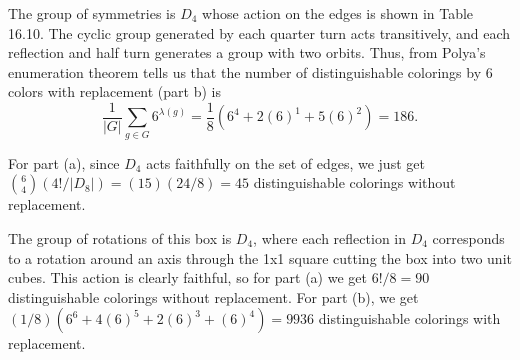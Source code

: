 \documentclass{article}
\begin{document}
 The group of symmetries is $D_4$ whose action on the edges is shown in Table 16.10.  The cyclic group generated by each quarter turn acts transitively, and each reflection and half turn generates a group with two orbits.
Thus, from Polya's enumeration theorem tells us that the number of distinguishable colorings by 6 colors with replacement (part b) is
$$ \frac 1 {|G|} \sum_{g \in G} 6^{\lambda(g)}
= \frac 1 8 (6^4 + 2(6)^1 + 5(6)^2) 
= 186.
$$

For part (a), since $D_4$ acts faithfully on the set of edges, we just get ${6 \choose 4} (4!/|D_8|) =  (15) (24/8) = 45$ distinguishable colorings without replacement.

  The group of rotations of this box is $D_4$, where each reflection in $D_4$ corresponds to a rotation around an axis through the 1x1 square cutting the box into two unit cubes.  This action is clearly faithful, so for part (a) we get $6!/8 = 90$ distinguishable colorings without replacement.  For part (b), we get $(1/8)(6^6 + 4(6)^5 + 2(6)^3 + (6)^4) = 9936$ distinguishable colorings with replacement.
\end{document}
